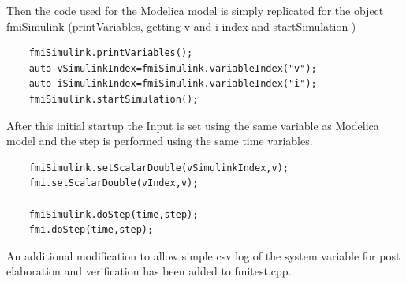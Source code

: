 Then the code used for the Modelica model is simply replicated for the object fmiSimulink (printVariables, getting v and i index and startSimulation )

\begin{verbatim}
    fmiSimulink.printVariables();
    auto vSimulinkIndex=fmiSimulink.variableIndex("v");
    auto iSimulinkIndex=fmiSimulink.variableIndex("i"); 
    fmiSimulink.startSimulation();
\end{verbatim}

After this initial startup the Input is set using the same variable as Modelica model and the step is performed using the same time variables.

\begin{verbatim}
    fmiSimulink.setScalarDouble(vSimulinkIndex,v);
    fmi.setScalarDouble(vIndex,v);
    
    fmiSimulink.doStep(time,step);
    fmi.doStep(time,step);
\end{verbatim}
An additional modification to allow simple csv log of the system variable for post elaboration and verification has been added to fmitest.cpp.

